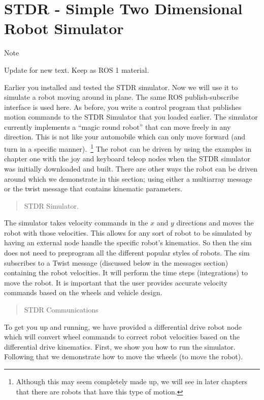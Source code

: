 \hypertarget{stdr---simple-two-dimensional-robot-simulator}{%
\section{STDR - Simple Two Dimensional Robot
Simulator}\label{stdr---simple-two-dimensional-robot-simulator}}

Note

Update for new text. Keep as ROS 1 material.

Earlier you installed and tested the STDR simulator. Now we will use it
to simulate a robot moving around in plane. The same ROS
publish-subscribe interface is used here. As before, you write a control
program that publishes motion commands to the STDR Simulator that you
loaded earlier. The simulator currently implements a ``magic round
robot'' that can move freely in any direction. This is not like your
automobile which can only move forward (and turn in a specific
manner).~\footnote{Although this may seem completely made up, we will
  see in later chapters that there are robots that have this type of
  motion.} The robot can be driven by using the examples in chapter one
with the joy and keyboard teleop nodes when the STDR simulator was
initially downloaded and built. There are other ways the robot can be
driven around which we demonstrate in this section; using either a
multiarray message or the twist message that contains kinematic
parameters.

\begin{quote}
STDR Simulator.
\end{quote}

The simulator takes velocity commands in the \(x\) and \(y\) directions
and moves the robot with those velocities. This allows for any sort of
robot to be simulated by having an external node handle the specific
robot's kinematics. So then the sim does not need to preprogram all the
different popular styles of robots. The sim subscribes to a Twist
message (discussed below in the messages section) containing the robot
velocities. It will perform the time steps (integrations) to move the
robot. It is important that the user provides accurate velocity commands
based on the wheels and vehicle design.

\begin{quote}
STDR Communications
\end{quote}

To get you up and running, we have provided a differential drive robot
node which will convert wheel commands to correct robot velocities based
on the differential drive kinematics. First, we show you how to run the
simulator. Following that we demonstrate how to move the wheels (to move
the robot).

